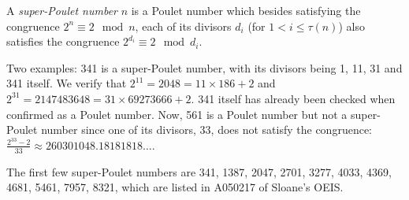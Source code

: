 \documentclass[12pt]{article}
\begin{document}
A {\em super-Poulet number} $n$ is a Poulet number which besides satisfying the congruence $2^n \equiv 2 \mod n$, each of its divisors $d_i$ (for $1 < i \leq \tau(n)$) also satisfies the congruence $2^{d_i} \equiv 2 \mod d_i$.

Two examples: 341 is a super-Poulet number, with its divisors being 1, 11, 31 and 341 itself. We verify that $2^{11} = 2048 = 11 \times 186 + 2$ and $2^{31} = 2147483648 = 31 \times 69273666 + 2$. 341 itself has already been checked when confirmed as a Poulet number. Now, 561 is a Poulet number but not a super-Poulet number since one of its divisors, 33, does not satisfy the congruence: $\frac{2^{33} - 2}{33} \approx 260301048.18181818 \ldots$.

The first few super-Poulet numbers are 341, 1387, 2047, 2701, 3277, 4033, 4369, 4681, 5461, 7957, 8321, which are listed in A050217 of Sloane's OEIS.
\end{document}
